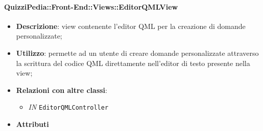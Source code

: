 \paragraph{QuizziPedia::Front-End::Views::EditorQMLView}
\begin{itemize}
	\item \textbf{Descrizione}: view contenente l'editor QML per la creazione di domande personalizzate;
	\item \textbf{Utilizzo}: permette ad un utente di creare domande personalizzate attraverso la scrittura del codice QML direttamente nell'editor di testo presente nella view;
	\item \textbf{Relazioni con altre classi}:
	\begin{itemize}
		\item \textit{IN} \texttt{EditorQMLController} \\
	\end{itemize}
	\item \textbf{Attributi}
\end{itemize}

